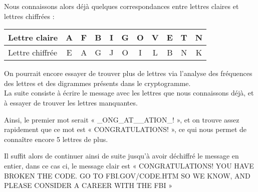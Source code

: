 Nous connaissons alors déjà quelques correspondances entre lettres
claires et lettres chiffrées : \\
\begin{center}
  \begin{tabular}{|l|c|c|c|c|c|c|c|c|c|c|}
    \hline
    Lettre claire & A & F & B & I & G & O & V & E & T & N \\
    \hline
    Lettre chiffrée & E & A & G & J & O & I & L & B & N & K \\
    \hline
  \end{tabular}
\end{center}
%
On pourrait encore essayer de trouver plus de lettres via
l'analyse des fréquences des lettres et des digrammes présents dans
le cryptogramme.
\\

La suite consiste à écrire le message avec les lettres que nous
connaissons déjà, et à essayer de trouver les lettres manquantes.

Ainsi, le premier mot serait « \_ONG\_AT\_\_ATION\_! », et on trouve
assez rapidement que ce mot est « CONGRATULATIONS! », ce qui nous
permet de connaître encore 5 lettres de plus.

Il suffit alors de continuer ainsi de suite jusqu'à avoir
déchiffré le message en entier, dans ce cas ci, le message clair
est « CONGRATULATIONS! YOU HAVE BROKEN THE CODE. GO TO
FBI.GOV/CODE.HTM SO WE KNOW, AND PLEASE CONSIDER A CAREER WITH THE
FBI »
